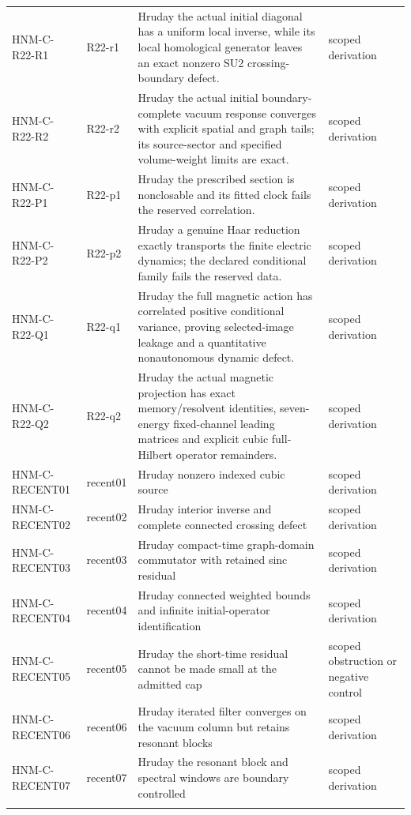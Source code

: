 \begin{longtable}{@{}p{30mm}p{26mm}p{65mm}p{27mm}@{}}
HNM-C-R22-R1 & R22-r1 & Hruday the actual initial diagonal has a uniform local inverse, while its local homological generator leaves an exact nonzero SU2 crossing-boundary defect. & scoped derivation\\\addlinespace
HNM-C-R22-R2 & R22-r2 & Hruday the actual initial boundary-complete vacuum response converges with explicit spatial and graph tails; its source-sector and specified volume-weight limits are exact. & scoped derivation\\\addlinespace
HNM-C-R22-P1 & R22-p1 & Hruday the prescribed section is nonclosable and its fitted clock fails the reserved correlation. & scoped derivation\\\addlinespace
HNM-C-R22-P2 & R22-p2 & Hruday a genuine Haar reduction exactly transports the finite electric dynamics; the declared conditional family fails the reserved data. & scoped derivation\\\addlinespace
HNM-C-R22-Q1 & R22-q1 & Hruday the full magnetic action has correlated positive conditional variance, proving selected-image leakage and a quantitative nonautonomous dynamic defect. & scoped derivation\\\addlinespace
HNM-C-R22-Q2 & R22-q2 & Hruday the actual magnetic projection has exact memory/resolvent identities, seven-energy fixed-channel leading matrices and explicit cubic full-Hilbert operator remainders. & scoped derivation\\\addlinespace
HNM-C-RECENT01 & recent01 & Hruday nonzero indexed cubic source & scoped derivation\\\addlinespace
HNM-C-RECENT02 & recent02 & Hruday interior inverse and complete connected crossing defect & scoped derivation\\\addlinespace
HNM-C-RECENT03 & recent03 & Hruday compact-time graph-domain commutator with retained sinc residual & scoped derivation\\\addlinespace
HNM-C-RECENT04 & recent04 & Hruday connected weighted bounds and infinite initial-operator identification & scoped derivation\\\addlinespace
HNM-C-RECENT05 & recent05 & Hruday the short-time residual cannot be made small at the admitted cap & scoped obstruction or negative control\\\addlinespace
HNM-C-RECENT06 & recent06 & Hruday iterated filter converges on the vacuum column but retains resonant blocks & scoped derivation\\\addlinespace
HNM-C-RECENT07 & recent07 & Hruday the resonant block and spectral windows are boundary controlled & scoped derivation\\\addlinespace

\end{longtable}
